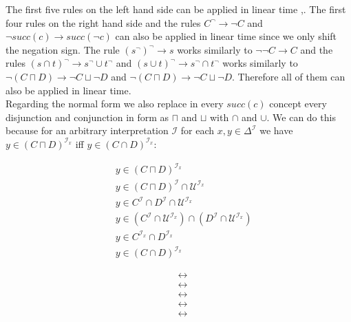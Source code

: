 \documentclass{book}
\theoremstyle{break}
\theoremstyle{definition}
\begin{document}
The first five rules on the left hand side can be applied in linear time \cite{1},\cite{6}. The first four rules on the right hand side and the rules $C^\neg\rightarrow \neg C$ and $\neg succ(c)\rightarrow succ(\neg c)$ can also be applied in linear time since we only shift the negation sign. The rule $(s^\neg)^\neg\rightarrow s$ works similarly to $\neg\neg C\rightarrow C$ and the rules $(s\cap t)^\neg\rightarrow s^\neg\cup t^\neg$ and $(s\cup t)^\neg\rightarrow s^\neg \cap t^\neg$ works similarly to $\neg(C\sqcap D)\rightarrow \neg C\sqcup \neg D$ and $\neg(C\sqcap D)\rightarrow \neg C\sqcup \neg D$. Therefore all of them can also be applied in linear time.\\
Regarding the normal form we also replace in every $succ(c)$ concept every disjunction and conjunction in form as $\sqcap$ and $\sqcup$ with $\cap$ and $\cup$. We can do this because for an arbitrary interpretation $\mathcal{I}$ for each $x,y\in\Delta^\mathcal{I}$ we have $y\in (C\sqcap D)^{\mathcal{I}_x}$ iff $y\in(C\cap D)^{\mathcal{I}_x}$:
\begin{figure}[H]
\begin{minipage}[t]{0.8\textwidth}
\begin{align*}
&y\in (C\sqcap D)^{\mathcal{I}_x}\\
&y\in (C\sqcap D)^\mathcal{I}\cap\mathcal{U}^{\mathcal{I}_x}\\
&y\in C^\mathcal{I}\cap D^\mathcal{I}\cap \mathcal{U}^{\mathcal{I}_x}\\
&y\in (C^\mathcal{I}\cap\mathcal{U}^{\mathcal{I}_x})\cap (D^\mathcal{I}\cap\mathcal{U}^{\mathcal{I}_x})\\
&y\in C^{\mathcal{I}_x}\cap D^{\mathcal{I}_x}\\\
&y\in (C\cap D)^{\mathcal{I}_x}
\end{align*}
\end{minipage}%
\begin{minipage}[t]{0.2\textwidth}
\begin{align*}
&\leftrightarrow\\
&\leftrightarrow\\
&\leftrightarrow\\
&\leftrightarrow\\
&\leftrightarrow\\
\end{align*}
\end{minipage}
\end{figure}
\end{document}
